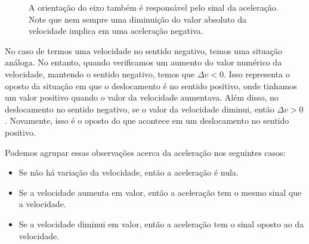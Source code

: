 \begin{figure}[!h]
\caption{A orientação do eixo também é responsável pelo sinal da aceleração. Note que nem sempre uma diminuição do valor absoluto da velocidade implica em uma aceleração negativa.}
\end{figure}

No caso de termos uma velocidade no sentido negativo, temos uma situação análoga. No entanto, quando verificamos um aumento do valor numérico da velocidade, mantendo o sentido negativo, temos que $\Delta v < 0$. Isso representa o oposto da situação em que o deslocamento é no sentido positivo, onde tinhamos um valor positivo quando o valor da velocidade aumentava. Além disso, no deslocamento no sentido negativo, se o valor da velocidade diminui, então $\Delta v > 0$. Novamente, isso é o oposto do que acontece em um deslocamento no sentido positivo.

Podemos agrupar essas observações acerca da aceleração nos seguintes casos:
\begin{itemize}
    \item Se não há variação da velocidade, então a aceleração é nula.
    \item Se a velocidade aumenta em valor, então a aceleração tem o mesmo sinal que a velocidade.
    \item Se a velocidade diminui em valor, então a aceleração tem o sinal oposto ao da velocidade.
\end{itemize}


